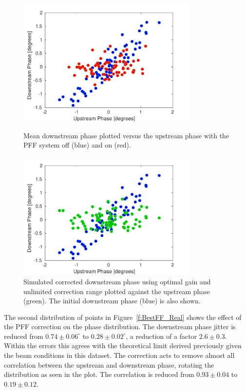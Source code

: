 \begin{figure}
  \centering
  \includegraphics[width=0.8\textwidth]{Figures/feedforward/BestFF_Real}
  \caption{Mean downstream phase plotted versus the upstream phase with the PFF system off (blue) and on (red).}
  \label{f:BestFF_Real}

  \includegraphics[width=0.8\textwidth]{Figures/feedforward/BestFF_Simulated}
  \caption{Simulated corrected downstream phase using optimal gain and unlimited correction range plotted against the upstream phase (green). The initial downstream phase (blue) is also shown. }
  \label{f:BestFF_Simulated}
\end{figure}


The second distribution of points in Figure~\ref{f:BestFF_Real} shows the effect of the PFF correction on the phase distribution. The downstream phase jitter is reduced from \(0.74\pm0.06^\circ\) to \(0.28\pm0.02^\circ\), a reduction of a factor \(2.6\pm0.3\). Within the errors this agrees with the theoretical limit derived previously given the beam conditions in this dataset. The correction acts to remove almost all correlation between the upstream and downstream phase, rotating the distribution as seen in the plot. The correlation is reduced from \(0.93\pm0.04\) to \(0.19\pm0.12\).

